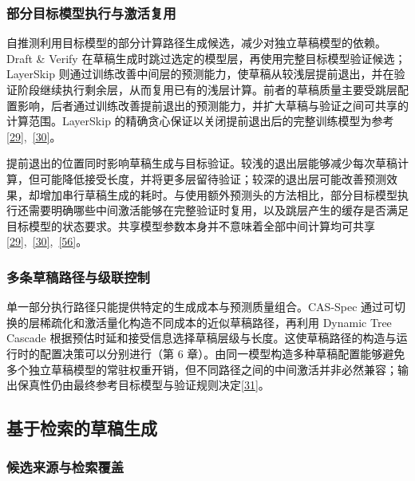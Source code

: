 \documentclass[11pt,a4paper,UTF8,fontset=none,scheme=plain,zihao=-4]{ctexart}
\begin{document}
\hypertarget{section-3-3-1}{%
\subsubsection{部分目标模型执行与激活复用}\label{section-3-3-1}}

自推测利用目标模型的部分计算路径生成候选，减少对独立草稿模型的依赖。Draft
\& Verify
在草稿生成时跳过选定的模型层，再使用完整目标模型验证候选；LayerSkip
则通过训练改善中间层的预测能力，使草稿从较浅层提前退出，并在验证阶段继续执行剩余层，从而复用已有的浅层计算。前者的草稿质量主要受跳层配置影响，后者通过训练改善提前退出的预测能力，并扩大草稿与验证之间可共享的计算范围。LayerSkip
的精确贪心保证以关闭提前退出后的完整训练模型为参考\protect\hyperlink{ref-draftverify}{{[}29{]}},~\protect\hyperlink{ref-layerskip}{{[}30{]}}。

提前退出的位置同时影响草稿生成与目标验证。较浅的退出层能够减少每次草稿计算，但可能降低接受长度，并将更多层留待验证；较深的退出层可能改善预测效果，却增加串行草稿生成的耗时。与使用额外预测头的方法相比，部分目标模型执行还需要明确哪些中间激活能够在完整验证时复用，以及跳层产生的缓存是否满足目标模型的状态要求。共享模型参数本身并不意味着全部中间计算均可共享\protect\hyperlink{ref-draftverify}{{[}29{]}},~\protect\hyperlink{ref-layerskip}{{[}30{]}},~\protect\hyperlink{ref-eagle}{{[}56{]}}。

\hypertarget{section-3-3-2}{%
\subsubsection{多条草稿路径与级联控制}\label{section-3-3-2}}

单一部分执行路径只能提供特定的生成成本与预测质量组合。CAS-Spec
通过可切换的层稀疏化和激活量化构造不同成本的近似草稿路径，再利用 Dynamic
Tree Cascade
根据预估时延和接受信息选择草稿层级与长度。这使草稿路径的构造与运行时的配置决策可以分别进行（第
6
章）。由同一模型构造多种草稿配置能够避免多个独立草稿模型的常驻权重开销，但不同路径之间的中间激活并非必然兼容；输出保真性仍由最终参考目标模型与验证规则决定\protect\hyperlink{ref-casspec}{{[}31{]}}。

\hypertarget{section-3-4}{%
\subsection{基于检索的草稿生成}\label{section-3-4}}

\hypertarget{section-3-4-1}{%
\subsubsection{候选来源与检索覆盖}\label{section-3-4-1}}
\end{document}
